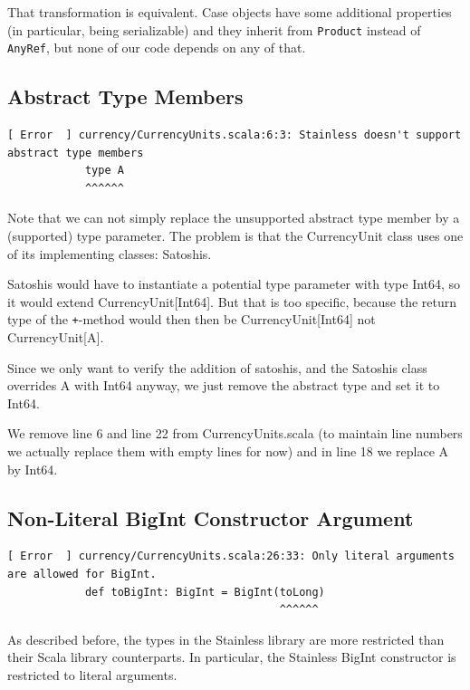\documentclass[runningheads]{llncs}
\begin{document}
That transformation is equivalent. Case objects have some additional
properties (in particular, being serializable) and they inherit from
\texttt{Product} instead of \texttt{AnyRef}, but none of our code
depends on any of that.


\subsection{Abstract Type Members}


\begin{lstlisting}[style=stainless]
[ Error  ] currency/CurrencyUnits.scala:6:3: Stainless doesn't support abstract type members
            type A
            ^^^^^^
\end{lstlisting}

Note that we can not simply replace the unsupported abstract type
member by a (supported) type parameter. The problem is that the
CurrencyUnit class uses one of its implementing classes: Satoshis.

Satoshis would have to instantiate a potential type parameter with
type Int64, so it would extend CurrencyUnit[Int64]. But that is too
specific, because the return type of the \texttt{+}-method would then then be
CurrencyUnit[Int64] not CurrencyUnit[A].

Since we only want to verify the addition of satoshis, and the
Satoshis class overrides A with Int64 anyway, we just remove the
abstract type and set it to Int64.

We remove line 6 and line 22 from CurrencyUnits.scala (to maintain
line numbers we actually replace them with empty lines for now) and in
line 18 we replace A by Int64.


\subsection{Non-Literal BigInt Constructor Argument}


\begin{lstlisting}[style=stainless]
[ Error  ] currency/CurrencyUnits.scala:26:33: Only literal arguments are allowed for BigInt.
            def toBigInt: BigInt = BigInt(toLong)
                                          ^^^^^^
\end{lstlisting}

As described before, the types in the Stainless library are more
restricted than their Scala library counterparts. In particular, the
Stainless BigInt constructor is restricted to literal arguments.
\end{document}
